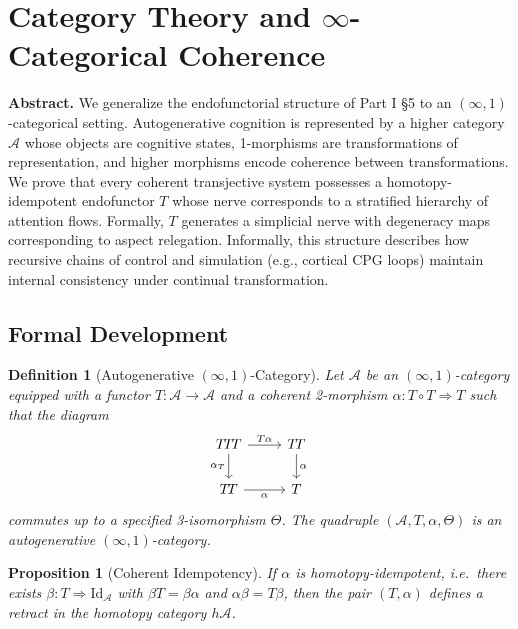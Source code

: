 \documentclass[12pt,a4paper,twoside,openright]{book}
\newtheorem{proposition}[theorem]{Proposition}
\newtheorem{definition}[theorem]{Definition}
\begin{document}
\section{Category Theory and \texorpdfstring{$\infty$}{∞}-Categorical Coherence}
\label{sec:category}
\textbf{Abstract.}
We generalize the endofunctorial structure of Part I §5 to an $(\infty,1)$-categorical setting.
Autogenerative cognition is represented by a higher category
\(\mathcal{A}\) whose objects are cognitive states,
1-morphisms are transformations of representation,
and higher morphisms encode coherence between transformations.
We prove that every coherent transjective system possesses a homotopy-idempotent endofunctor \(T\) whose nerve corresponds to a stratified hierarchy of attention flows.
Formally, \(T\) generates a simplicial nerve with degeneracy maps corresponding to aspect relegation.
Informally, this structure describes how recursive chains of control and simulation (e.g., cortical CPG loops) maintain internal consistency under continual transformation.

\subsection*{Formal Development}
\begin{definition}[Autogenerative $(\infty,1)$-Category]
Let \(\mathcal{A}\) be an $(\infty,1)$-category equipped with a functor
\(T\colon\mathcal{A}\to\mathcal{A}\)
and a coherent 2-morphism
\(\alpha:T\!\circ\!T\Rightarrow T\)
such that the diagram
\[
\begin{tikzcd}
T\!T\!T \arrow[r,"T\alpha"] \arrow[d,"\alpha_T"'] & T\!T \arrow[d,"\alpha"]\\
T\!T \arrow[r,"\alpha"'] & T
\end{tikzcd}
\]
commutes up to a specified 3-isomorphism \(\Theta\).
The quadruple \((\mathcal{A},T,\alpha,\Theta)\) is an \emph{autogenerative $(\infty,1)$-category}.
\end{definition}

\begin{proposition}[Coherent Idempotency]
\label{prop:coherentidempotent}
If \(\alpha\) is homotopy-idempotent, i.e.\ there exists
\(\beta:T\Rightarrow\mathrm{Id}_{\mathcal{A}}\)
with \(\beta T=\beta\alpha\) and \(\alpha\beta=T\beta\),
then the pair \((T,\alpha)\) defines a retract in the homotopy category $h\mathcal{A}$.
\end{proposition}
\end{document}
